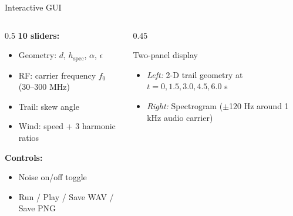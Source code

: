 \documentclass[aspectratio=169,11pt]{beamer}
\begin{document}
\begin{frame}{Interactive GUI}
\begin{columns}
\begin{column}{0.5\textwidth}
\textbf{10 sliders:}
\begin{itemize}
    \item Geometry: $d$, $h_{\mathrm{spec}}$, $\alpha$, $\epsilon$
    \item RF: carrier frequency $f_0$ (30--300 MHz)
    \item Trail: skew angle
    \item Wind: speed + 3 harmonic ratios
\end{itemize}
\vspace{0.3em}
\textbf{Controls:}
\begin{itemize}
    \item Noise on/off toggle
    \item Run / Play / Save WAV / Save PNG
\end{itemize}
\end{column}
\begin{column}{0.45\textwidth}
\begin{block}{Two-panel display}
\begin{itemize}
    \item \textit{Left:} 2-D trail geometry at $t = 0, 1.5, 3.0, 4.5, 6.0$ s
    \item \textit{Right:} Spectrogram ($\pm$120 Hz around 1 kHz audio carrier)
\end{itemize}
\end{block}
\end{column}
\end{columns}
\end{frame}

\end{document}
